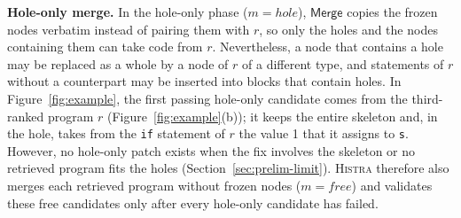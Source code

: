 \documentclass[10pt,conference]{IEEEtran}
\begin{document}
\textbf{Hole-only merge.} In the hole-only phase ($m = \mathit{hole}$), $\mathsf{Merge}$ copies the frozen nodes verbatim instead of pairing them with $r$, so only the holes and the nodes containing them can take code from $r$. Nevertheless, a node that contains a hole may be replaced as a whole by a node of $r$ of a different type, and statements of $r$ without a counterpart may be inserted into blocks that contain holes. In Figure~\ref{fig:example}, the first passing hole-only candidate comes from the third-ranked program $r$ (Figure~\ref{fig:example}(b)); it keeps the entire skeleton and, in the hole, takes from the \texttt{if} statement of $r$ the value 1 that it assigns to \texttt{s}. However, no hole-only patch exists when the fix involves the skeleton or no retrieved program fits the holes (Section~\ref{sec:prelim-limit}). \textsc{Histra} therefore also merges each retrieved program without frozen nodes ($m = \mathit{free}$) and validates these free candidates only after every hole-only candidate has failed.
\end{document}
